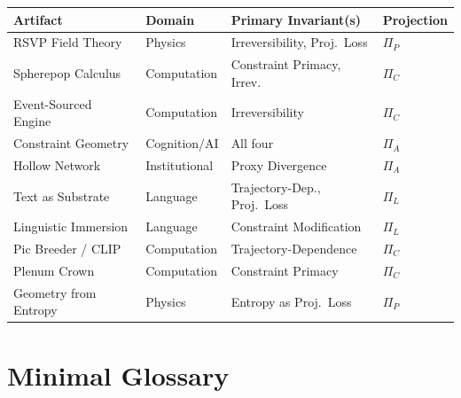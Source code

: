 \documentclass[12pt, twoside]{article}
\theoremstyle{plain}
\theoremstyle{definition}
\theoremstyle{remark}
\newcommand{\Proj}{\Pi}
\begin{document}
\begin{center}
\begin{tabular}{llll}
\toprule
\textbf{Artifact} & \textbf{Domain} & \textbf{Primary Invariant(s)} & \textbf{Projection} \\
\midrule
RSVP Field Theory & Physics & Irreversibility, Proj.\ Loss & $\Proj_P$ \\
Spherepop Calculus & Computation & Constraint Primacy, Irrev. & $\Proj_C$ \\
Event-Sourced Engine & Computation & Irreversibility & $\Proj_C$ \\
Constraint Geometry & Cognition/AI & All four & $\Proj_A$ \\
Hollow Network & Institutional & Proxy Divergence & $\Proj_A$ \\
Text as Substrate & Language & Trajectory-Dep., Proj.\ Loss & $\Proj_L$ \\
Linguistic Immersion & Language & Constraint Modification & $\Proj_L$ \\
Pic Breeder / CLIP & Computation & Trajectory-Dependence & $\Proj_C$ \\
Plenum Crown & Computation & Constraint Primacy & $\Proj_C$ \\
Geometry from Entropy & Physics & Entropy as Proj.\ Loss & $\Proj_P$ \\
\bottomrule
\end{tabular}
\end{center}

\section{Minimal Glossary}
\end{document}
